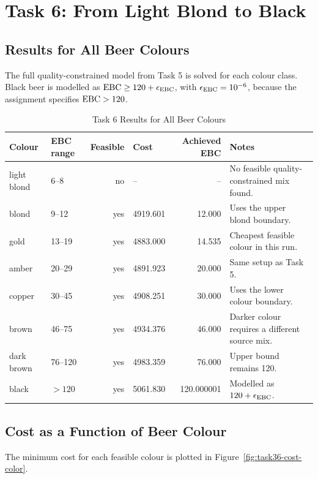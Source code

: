 \section{Task 6: From Light Blond to Black}
\label{sec:task6}

\subsection{Results for All Beer Colours}
\label{sec:task6-results}
The full quality-constrained model from Task 5 is solved for each colour class. Black beer is modelled as $\mathrm{EBC} \geq 120+\epsilon_{\mathrm{EBC}}$, with $\epsilon_{\mathrm{EBC}}=10^{-6}$, because the assignment specifies $\mathrm{EBC}>120$.

\begin{table}[!t]
\renewcommand{\arraystretch}{1.15}
\caption{Task 6 Results for All Beer Colours}
\label{tab:task36-colors}
\centering
\small
\begin{tabular}{@{}llrlrp{}@{}}
\toprule
Colour & EBC range & Feasible & Cost & Achieved EBC & Notes \\
\midrule
light blond & 6--8 & no & -- & -- & No feasible quality-constrained mix found. \\
blond & 9--12 & yes & 4919.601 & 12.000 & Uses the upper blond boundary. \\
gold & 13--19 & yes & 4883.000 & 14.535 & Cheapest feasible colour in this run. \\
amber & 20--29 & yes & 4891.923 & 20.000 & Same setup as Task 5. \\
copper & 30--45 & yes & 4908.251 & 30.000 & Uses the lower colour boundary. \\
brown & 46--75 & yes & 4934.376 & 46.000 & Darker colour requires a different source mix. \\
dark brown & 76--120 & yes & 4983.359 & 76.000 & Upper bound remains 120. \\
black & $>120$ & yes & 5061.830 & 120.000001 & Modelled as $120+\epsilon_{\mathrm{EBC}}$. \\
\bottomrule
\end{tabular}
\end{table}

\subsection{Cost as a Function of Beer Colour}
\label{sec:task6-plot}
The minimum cost for each feasible colour is plotted in Figure~\ref{fig:task36-cost-color}.

